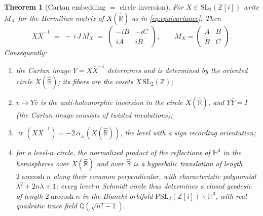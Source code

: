 \documentclass[11pt]{amsart}
\numberwithin{equation}{section}
\theoremstyle{plain}
\newtheorem{theorem}{Theorem}[section]
\theoremstyle{definition}
\theoremstyle{remark}
\newcommand{\R}{\mathbb{R}}
\newcommand{\Q}{\mathbb{Q}}
\newcommand{\Z}{\mathbb{Z}}
\newcommand{\HH}{\mathbb{H}}
\newcommand{\Zi}{\Z[i]}
\newcommand{\Rhat}{\widehat{\R}}
\newcommand{\SL}{\mathrm{SL}}
\newcommand{\PSL}{\mathrm{PSL}}
\newcommand{\tr}{\operatorname{tr}}
\newcommand{\arccosh}{\operatorname{arccosh}}
\begin{document}
\begin{theorem}[Cartan embedding $=$ circle inversion]\label{thm:cartan}
For $X \in \SL_2(\Zi)$ write $M_X$ for the Hermitian matrix of
$X(\Rhat)$ as in \eqref{eq:equivariance}.  Then
\begin{equation}\label{eq:funfact}
  X\bar X^{-1} \;=\; -\,i\,J\,\overline{M_X}
  \;=\; \begin{pmatrix} -iB & -iC \\ iA & i\bar B\end{pmatrix},
  \qquad
  M_X = \begin{pmatrix} A & B \\ \bar B & C \end{pmatrix}.
\end{equation}
Consequently:
\begin{enumerate}
\item the Cartan image $Y = X\bar X^{-1}$ determines and is determined
by the oriented circle $X(\Rhat)$; its fibers are the cosets
$X\,\SL_2(\Z)$;
\item $v \mapsto Y\bar v$ is the anti-holomorphic inversion in the
circle $X(\Rhat)$, and $Y\bar Y = I$ (the Cartan image consists of
twisted involutions);
\item $\tr(X\bar X^{-1}) = -2\,\alpha_{\pm}(X(\Rhat))$, the level with
a sign recording orientation;
\item for a level-$n$ circle, the normalized product of the reflections
of $\HH^3$ in the hemispheres over $X(\Rhat)$ and over $\Rhat$ is a
hyperbolic translation of length $2\arccosh n$ along their common
perpendicular, with characteristic polynomial
$\lambda^2 + 2n\lambda + 1$; every level-$n$ Schmidt circle thus
determines a closed geodesic of length $2\arccosh n$ in the Bianchi
orbifold $\PSL_2(\Zi)\backslash\HH^3$, with real quadratic trace field
$\Q(\sqrt{n^2 - 1})$.
\end{enumerate}
\end{theorem}
\end{document}
